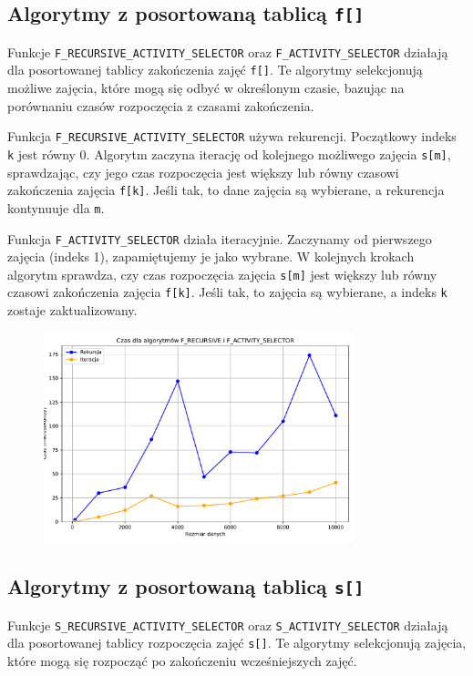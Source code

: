\documentclass{article}
\begin{document}
	\subsection{Algorytmy z posortowaną tablicą \texttt{f[]}}
	Funkcje \texttt{F\_RECURSIVE\_ACTIVITY\_SELECTOR} oraz \texttt{F\_ACTIVITY\_SELECTOR} działają dla posortowanej tablicy zakończenia zajęć \texttt{f[]}. Te algorytmy selekcjonują możliwe zajęcia, które mogą się odbyć w określonym czasie, bazując na porównaniu czasów rozpoczęcia z czasami zakończenia. 
	
	Funkcja \texttt{F\_RECURSIVE\_ACTIVITY\_SELECTOR} używa rekurencji. Początkowy indeks \texttt{k} jest równy 0. Algorytm zaczyna iterację od kolejnego możliwego zajęcia \texttt{s[m]}, sprawdzając, czy jego czas rozpoczęcia jest większy lub równy czasowi zakończenia zajęcia \texttt{f[k]}. Jeśli tak, to dane zajęcia są wybierane, a rekurencja kontynuuje dla \texttt{m}. 
	
	Funkcja \texttt{F\_ACTIVITY\_SELECTOR} działa iteracyjnie. Zaczynamy od pierwszego zajęcia (indeks 1), zapamiętujemy je jako wybrane. W kolejnych krokach algorytm sprawdza, czy czas rozpoczęcia zajęcia \texttt{s[m]} jest większy lub równy czasowi zakończenia zajęcia \texttt{f[k]}. Jeśli tak, to zajęcia są wybierane, a indeks \texttt{k} zostaje zaktualizowany.
		\begin{figure}[H]
		\centering
		\includegraphics[width=0.8\textwidth]{wykres6.pdf}
	\end{figure}
	
	\subsection{Algorytmy z posortowaną tablicą \texttt{s[]}}
	
	Funkcje \texttt{S\_RECURSIVE\_ACTIVITY\_SELECTOR} oraz \texttt{S\_ACTIVITY\_SELECTOR} działają dla posortowanej tablicy rozpoczęcia zajęć \texttt{s[]}. Te algorytmy selekcjonują zajęcia, które mogą się rozpocząć po zakończeniu wcześniejszych zajęć. 
	
\end{document}
